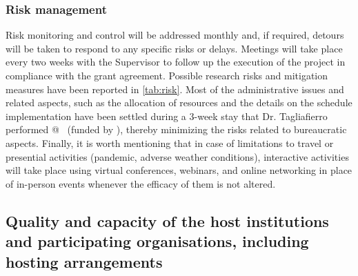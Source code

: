 \vspace{-3ex}\subsubsection*{Risk management}\vspace{-1ex}
Risk monitoring and control will be addressed monthly and, if required, detours will be taken to respond to any specific risks or delays. Meetings will take place every two weeks with the Supervisor to follow up the execution of the project in compliance with the grant agreement. Possible research risks and mitigation measures have been reported in \autoref{tab:risk}. Most of the administrative issues and related aspects, such as the allocation of resources and the details on the schedule implementation have been settled during a 3-week stay that Dr. Tagliafierro performed @ \UU\ (funded by \UU), thereby minimizing the risks related to bureaucratic aspects. Finally, it is worth mentioning that in case of limitations to travel or presential activities (pandemic, adverse weather conditions), interactive activities will take place using virtual conferences, webinars, and online networking in place of in-person events whenever the efficacy of them is not altered.\vspace{-1.5ex}




\begin{table}[h!]
\centering
\caption{\small Risk management: identification and proposed mitigation actions.}\vspace{0.5ex}
\label{tab:risk}
\def\arraystretch{1.2}
\scriptsize{

}
\vspace{-3ex}
\end{table}

\vspace{-2ex}\subsection{Quality and capacity of the host institutions and participating organisations, including hosting arrangements}\label{sec:3.2}


